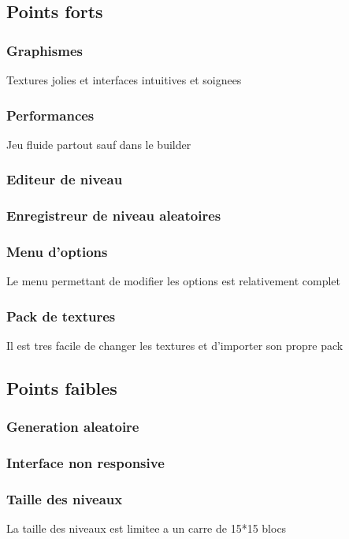 \documentclass[../main.tex]{subfiles}
\begin{document}
\subsection{Points forts}
\subsubsection{Graphismes}
Textures jolies et interfaces intuitives et soignees
\subsubsection{Performances}
Jeu fluide partout sauf dans le builder
\subsubsection{Editeur de niveau}
\subsubsection{Enregistreur de niveau aleatoires}
\subsubsection{Menu d'options}
Le menu permettant de modifier les options est relativement complet
\subsubsection{Pack de textures}
Il est tres facile de changer les textures et d'importer son propre pack

\subsection{Points faibles}
\subsubsection{Generation aleatoire}
\subsubsection{Interface non responsive}
\subsubsection{Taille des niveaux}
La taille des niveaux est limitee a un carre de 15*15 blocs
\end{document}

